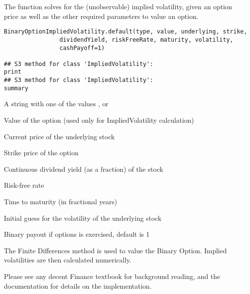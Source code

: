 \begin{Description}\relax
The  function solves for the
(unobservable) implied volatility, given an option price as well as
the other required parameters to value an option.
\end{Description}
\begin{Usage}
\begin{verbatim}
BinaryOptionImpliedVolatility.default(type, value, underlying, strike,
                dividendYield, riskFreeRate, maturity, volatility,
                cashPayoff=1)

## S3 method for class 'ImpliedVolatility':
print
## S3 method for class 'ImpliedVolatility':
summary
\end{verbatim}
\end{Usage}
\begin{Arguments}
\begin{ldescription}
\item[\code{type}] A string with one of the values ,  or
\item[\code{value}] Value of the option (used only for ImpliedVolatility calculation)
\item[\code{underlying}] Current price of the underlying stock
\item[\code{strike}] Strike price of the option
\item[\code{dividendYield}] Continuous dividend yield (as a fraction) of the stock
\item[\code{riskFreeRate}] Risk-free rate
\item[\code{maturity}] Time to maturity (in fractional years)
\item[\code{volatility}] Initial guess for the volatility of the underlying
stock
\item[\code{cashPayoff}] Binary payout if options is exercised, default is 1
\end{ldescription}
\end{Arguments}
\begin{Details}\relax
The Finite Differences method is used to value the Binary Option.
Implied volatilities are then calculated numerically.

Please see any decent Finance textbook for background reading, and the
 documentation for details on the 
implementation.
\end{Details}
